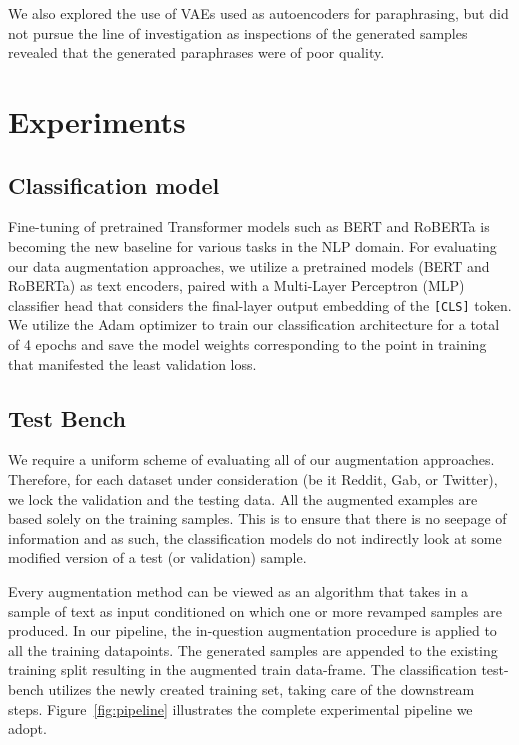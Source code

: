 \documentclass[11pt,a4paper]{article}
\begin{document}
We also explored the use of VAEs used as autoencoders for paraphrasing, but did not pursue the line of investigation as inspections of the generated samples revealed that the generated paraphrases were of poor quality.

\section{Experiments}
\subsection{Classification model}
Fine-tuning of pretrained Transformer models such as BERT \cite{devlin2018bert} and RoBERTa \cite{roberta} is becoming the new baseline for various tasks in the NLP domain. For evaluating our data augmentation approaches, we utilize a pretrained models (BERT and RoBERTa) as text encoders, paired with a Multi-Layer Perceptron (MLP) classifier head that considers the final-layer output embedding of the \texttt{[CLS]} token. We utilize the Adam optimizer to train our classification architecture for a total of 4 epochs and save the model weights corresponding to the point in training that manifested the least validation loss.

\subsection{Test Bench}
We require a uniform scheme of evaluating all of our augmentation approaches. Therefore, for each dataset under consideration (be it Reddit, Gab, or Twitter), we lock the validation and the testing data. All the augmented examples are based solely on the training samples. This is to ensure that there is no seepage of information and as such, the classification models do not indirectly look at some modified version of a test (or validation) sample.

Every augmentation method can be viewed as an algorithm that takes in a sample of text as input conditioned on which one or more revamped samples are produced. In our pipeline, the in-question augmentation procedure is applied to all the training datapoints. The generated samples are appended to the existing training split resulting in the augmented train data-frame. The classification test-bench utilizes the newly created training set, taking care of the downstream steps. Figure~\ref{fig:pipeline} illustrates the complete experimental pipeline we adopt.
\end{document}
